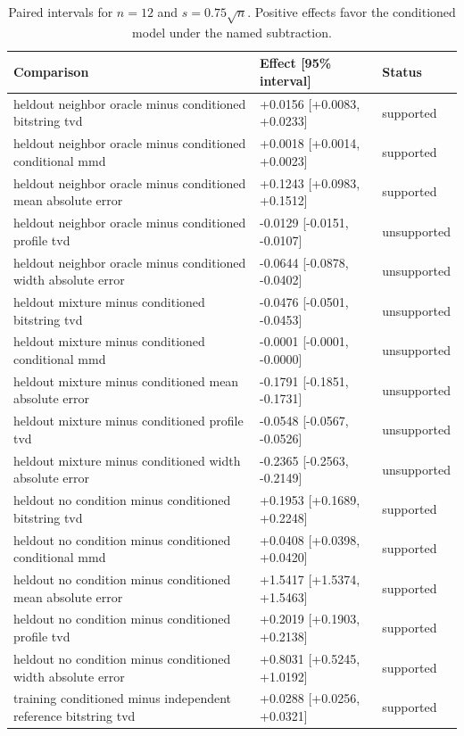 \begin{table}[p]
\centering
\scriptsize
\setlength{\tabcolsep}{4pt}
\caption{Paired intervals for $n=12$ and $s=0.75\sqrt n$. Positive effects favor the conditioned model under the named subtraction.}
\label{tab:all-intervals-n12-w0.75}
\begin{tabular}{@{}p{}p{}p{}@{}}
\toprule
Comparison & Effect [95\% interval] & Status\\
\midrule
heldout neighbor oracle minus conditioned bitstring tvd & +0.0156 [+0.0083, +0.0233] & supported \\
heldout neighbor oracle minus conditioned conditional mmd & +0.0018 [+0.0014, +0.0023] & supported \\
heldout neighbor oracle minus conditioned mean absolute error & +0.1243 [+0.0983, +0.1512] & supported \\
heldout neighbor oracle minus conditioned profile tvd & -0.0129 [-0.0151, -0.0107] & unsupported \\
heldout neighbor oracle minus conditioned width absolute error & -0.0644 [-0.0878, -0.0402] & unsupported \\
heldout mixture minus conditioned bitstring tvd & -0.0476 [-0.0501, -0.0453] & unsupported \\
heldout mixture minus conditioned conditional mmd & -0.0001 [-0.0001, -0.0000] & unsupported \\
heldout mixture minus conditioned mean absolute error & -0.1791 [-0.1851, -0.1731] & unsupported \\
heldout mixture minus conditioned profile tvd & -0.0548 [-0.0567, -0.0526] & unsupported \\
heldout mixture minus conditioned width absolute error & -0.2365 [-0.2563, -0.2149] & unsupported \\
heldout no condition minus conditioned bitstring tvd & +0.1953 [+0.1689, +0.2248] & supported \\
heldout no condition minus conditioned conditional mmd & +0.0408 [+0.0398, +0.0420] & supported \\
heldout no condition minus conditioned mean absolute error & +1.5417 [+1.5374, +1.5463] & supported \\
heldout no condition minus conditioned profile tvd & +0.2019 [+0.1903, +0.2138] & supported \\
heldout no condition minus conditioned width absolute error & +0.8031 [+0.5245, +1.0192] & supported \\
training conditioned minus independent reference bitstring tvd & +0.0288 [+0.0256, +0.0321] & supported \\

\end{tabular}
\end{table}
